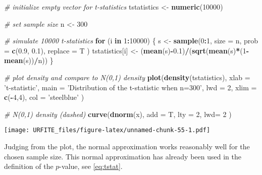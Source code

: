 \documentclass[]{book}
\newenvironment{Shaded}{\begin{snugshade}}{\end{snugshade}}
\newcommand{\KeywordTok}[1]{\textcolor[rgb]{0.13,0.29,0.53}{\textbf{#1}}}
\newcommand{\DataTypeTok}[1]{\textcolor[rgb]{0.13,0.29,0.53}{#1}}
\newcommand{\DecValTok}[1]{\textcolor[rgb]{0.00,0.00,0.81}{#1}}
\newcommand{\FloatTok}[1]{\textcolor[rgb]{0.00,0.00,0.81}{#1}}
\newcommand{\StringTok}[1]{\textcolor[rgb]{0.31,0.60,0.02}{#1}}
\newcommand{\CommentTok}[1]{\textcolor[rgb]{0.56,0.35,0.01}{\textit{#1}}}
\newcommand{\ControlFlowTok}[1]{\textcolor[rgb]{0.13,0.29,0.53}{\textbf{#1}}}
\newcommand{\OperatorTok}[1]{\textcolor[rgb]{0.81,0.36,0.00}{\textbf{#1}}}
\newcommand{\NormalTok}[1]{#1}
\theoremstyle{definition}
\theoremstyle{definition}
\theoremstyle{definition}
\theoremstyle{remark}
\begin{document}
\begin{Shaded}
\begin{Highlighting}[]
\CommentTok{# initialize empty vector for t-statistics}
\NormalTok{tstatistics <-}\StringTok{ }\KeywordTok{numeric}\NormalTok{(}\DecValTok{10000}\NormalTok{)}

\CommentTok{# set sample size}
\NormalTok{n <-}\StringTok{ }\DecValTok{300}

\CommentTok{# simulate 10000 t-statistics}
\ControlFlowTok{for}\NormalTok{ (i }\ControlFlowTok{in} \DecValTok{1}\OperatorTok{:}\DecValTok{10000}\NormalTok{) \{}
\NormalTok{  s <-}\StringTok{ }\KeywordTok{sample}\NormalTok{(}\DecValTok{0}\OperatorTok{:}\DecValTok{1}\NormalTok{, }
              \DataTypeTok{size =}\NormalTok{ n,  }
              \DataTypeTok{prob =} \KeywordTok{c}\NormalTok{(}\FloatTok{0.9}\NormalTok{, }\FloatTok{0.1}\NormalTok{),}
              \DataTypeTok{replace =}\NormalTok{ T}
\NormalTok{              )}
\NormalTok{  tstatistics[i] <-}\StringTok{ }\NormalTok{(}\KeywordTok{mean}\NormalTok{(s)}\OperatorTok{-}\FloatTok{0.1}\NormalTok{)}\OperatorTok{/}\NormalTok{(}\KeywordTok{sqrt}\NormalTok{(}\KeywordTok{mean}\NormalTok{(s)}\OperatorTok{*}\NormalTok{(}\DecValTok{1}\OperatorTok{-}\KeywordTok{mean}\NormalTok{(s))}\OperatorTok{/}\NormalTok{n))}
\NormalTok{\}}

\CommentTok{# plot density and compare to N(0,1) density}
\KeywordTok{plot}\NormalTok{(}\KeywordTok{density}\NormalTok{(tstatistics),}
     \DataTypeTok{xlab =} \StringTok{'t-statistic'}\NormalTok{,}
     \DataTypeTok{main =} \StringTok{'Distribution of the t-statistic when n=300'}\NormalTok{,}
     \DataTypeTok{lwd =} \DecValTok{2}\NormalTok{,}
     \DataTypeTok{xlim =} \KeywordTok{c}\NormalTok{(}\OperatorTok{-}\DecValTok{4}\NormalTok{,}\DecValTok{4}\NormalTok{),}
     \DataTypeTok{col =} \StringTok{'steelblue'}
\NormalTok{     )}

\CommentTok{# N(0,1) density (dashed)}
\KeywordTok{curve}\NormalTok{(}\KeywordTok{dnorm}\NormalTok{(x), }
      \DataTypeTok{add =}\NormalTok{ T, }
      \DataTypeTok{lty =} \DecValTok{2}\NormalTok{, }
      \DataTypeTok{lwd=} \DecValTok{2}
\NormalTok{      )}
\end{Highlighting}
\end{Shaded}

\texttt{[image: URFITE\_files/figure-latex/unnamed-chunk-55-1.pdf]}

Judging from the plot, the normal approximation works reasonably well
for the chosen sample size. This normal approximation has already been
used in the definition of the \(p\)-value, see \eqref{eq:tstat}.
\end{document}
